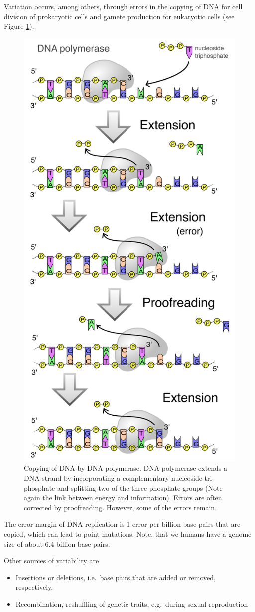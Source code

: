 \documentclass[
  11pt,
]{book}
\providecommand{\tightlist}{%
  \setlength{\itemsep}{0pt}\setlength{\parskip}{0pt}}
\begin{document}
Variation occurs, among others, through errors in the copying of DNA for cell division of prokaryotic cells and gamete production for eukaryotic cells (see Figure \ref{fig:dnaPolymerase}).

\begin{figure}

{\centering \includegraphics[width=0.45\linewidth]{./figs/DNA_polymerase} 

}

\caption{Copying of DNA by DNA-polymerase. DNA polymerase extends a DNA strand by incorporating a complementary nucleoside-tri-phosphate and splitting two of the three phosphate groups  (Note again the link between energy and information). Errors are often corrected by proofreading. However, some of the errors remain.}\label{fig:dnaPolymerase}
\end{figure}

The error margin of DNA replication is 1 error per billion base pairs that are copied, which can lead to point mutations. Note, that we humans have a genome size of about 6.4 billion base pairs.

Other sources of variability are

\begin{itemize}
\tightlist
\item
  Insertions or deletions, i.e.~base pairs that are added or removed, respectively.
\item
  Recombination, reshuffling of genetic traits, e.g.~during sexual reproduction
\end{itemize}
\end{document}
